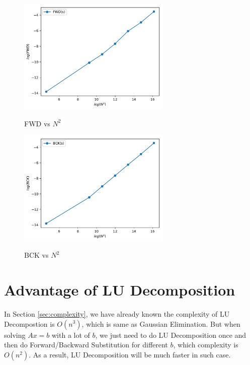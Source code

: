 \documentclass{article}
\begin{document}
\begin{figure}[H]
    \centering
    \caption{FWD vs $N^2$}
    \includegraphics[width=0.65\textwidth]{src/FWD.pdf}
    \label{fig:fwd}
\end{figure}
\begin{figure}[H]
    \centering
    \caption{BCK vs $N^2$}
    \includegraphics[width=0.65\textwidth]{src/BCK.pdf}
    \label{fig:bck}
\end{figure}

\section{Advantage of LU Decomposition}
In Section \ref{sec:complexity}, we have already known the complexity of LU Decompostion is $O(n^3)$, which is same as Gaussian 
Elimination. But when solving $Ax = b$ with a lot of $b$, we just need to do LU Decomposition once and then do Forward/Backward
Substitution for different $b$, which complexity is $O(n^2)$. As a result, LU Decomposition will be much faster in such case.
\end{document}
